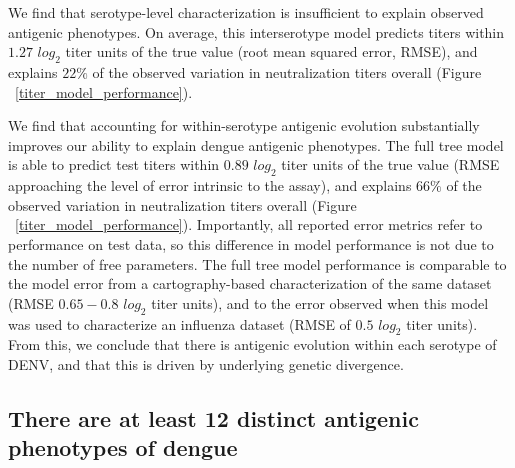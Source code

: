 \documentclass[11pt,oneside,letterpaper]{article}
\begin{document}
We find that serotype-level characterization is insufficient to explain observed antigenic phenotypes.
On average, this interserotype model predicts titers within $1.27$ $log_2$ titer units of the true value (root mean squared error, RMSE), and explains $22\%$ of the observed variation in neutralization titers overall (Figure ~\ref{titer_model_performance}).

We find that accounting for within-serotype antigenic evolution substantially improves our ability to explain dengue antigenic phenotypes.
The full tree model is able to predict test titers within $0.89$ $log_2$ titer units of the true value (RMSE approaching the level of error intrinsic to the assay), and explains $66\%$ of the observed variation in neutralization titers overall (Figure ~\ref{titer_model_performance}).
Importantly, all reported error metrics refer to performance on test data, so this difference in model performance is not due to the number of free parameters.
The full tree model performance is comparable to the model error from a cartography-based characterization of the same dataset (RMSE $0.65-0.8$ $log_2$ titer units), and to the error observed when this model was used to characterize an influenza dataset (RMSE of $0.5$ $log_2$ titer units).
From this, we conclude that there is antigenic evolution within each serotype of DENV, and that this is driven by underlying genetic divergence.

\subsection{There are at least 12 distinct antigenic phenotypes of dengue}
\end{document}
